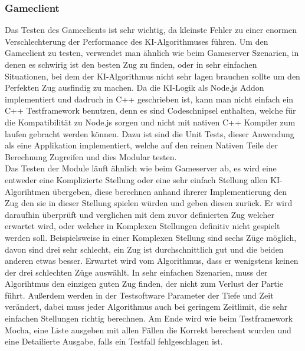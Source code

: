 \documentclass[12pt,a4paper,bibliography=totocnumbered,listof=totocnumbered]{article}
\begin{document}
\subsubsection{Gameclient}
Das Testen des Gameclients ist sehr wichtig, da kleinste Fehler zu einer enormen Verschlechterung der Performance des KI-Algorithmuses führen.
Um den Gameclient zu testen, verwendet man ähnlich wie beim Gameserver Szenarien, in denen es schwirig ist den besten Zug zu finden, oder 
in sehr einfachen Situationen, bei dem der KI-Algorithmus nicht sehr lagen brauchen sollte um den Perfekten Zug ausfindig zu machen.
Da die KI-Logik als Node.js Addon implementiert und dadruch in C++ geschrieben ist, kann man nicht einfach ein C++ Testframework benutzen, 
denn es sind Codeschnipsel enthalten, welche für die Kompatibilität zu Node.js sorgen und nicht mit nativen C++ Kompiler zum laufen gebracht werden können.
Dazu ist sind die Unit Tests, dieser Anwendung als eine Applikation implementiert, welche auf den reinen Nativen Teile der Berechnung Zugreifen und 
dies Modular testen. 
\\
Das Testen der Module läuft ähnlich wie beim Gameserver ab, es wird eine entweder eine Komplizierte Stellung oder eine sehr einfach Stellung 
allen KI-Algorihtmen übergeben, diese berechnen anhand ihrerer Implementierung den Zug den sie in dieser Stellung spielen würden und
geben diesen zurück. Er wird daraufhin überprüft und verglichen mit dem zuvor definierten Zug welcher erwartet wird, oder welcher in 
Komplexen Stellungen definitiv nicht gespielt werden soll. Beispielsweise in einer Komplexen Stellung sind sechs Züge möglich, davon sind drei sehr schlecht,
ein Zug ist durchschnittlich gut und die beiden anderen etwas besser. Erwartet wird vom Algorithmus, dass er wenigstens keinen der drei schlechten Züge
auswählt. In sehr einfachen Szenarien, muss der Algorihtmus den einzigen guten Zug finden, der nicht zum Verlust der Partie führt. 
Außerdem werden in der Testsoftware Parameter der Tiefe und Zeit verändert, dabei muss jeder Algorithmus auch bei geringem Zeitlimit, die sehr einfachen
Stellungen richtig berechnen. Am Ende wird wie beim Testframework Mocha, eine Liste ausgeben mit allen Fällen die Korrekt berechent wurden und 
eine Detailierte Ausgabe, falls ein Testfall fehlgeschlagen ist. 



\pagebreak
\end{document}
